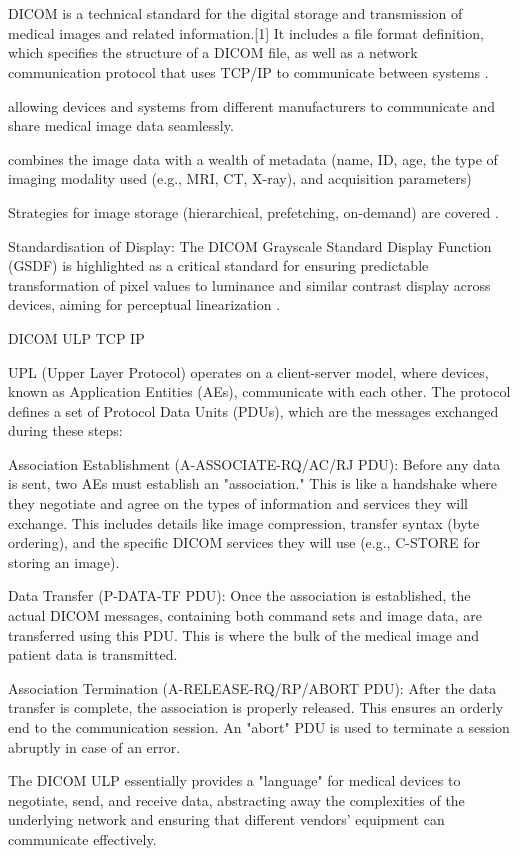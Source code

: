 \chapter{}

DICOM is a technical standard for the digital storage and transmission
of medical images and related information.[1] It includes a file
format definition, which specifies the structure of a DICOM file, as
well as a network communication protocol that uses TCP/IP to
communicate between systems \cite{wikipedia2025DICOM}.

allowing devices and systems from different manufacturers to communicate and share medical image data seamlessly.

combines the image data with a wealth of metadata (name, ID, age, the type of imaging modality used (e.g., MRI, CT, X-ray), and acquisition parameters)

Strategies for image storage (hierarchical, prefetching, on-demand)
are covered \cite{bushberg2011essential}.

Standardisation of Display: The DICOM Grayscale Standard Display Function (GSDF) is highlighted as a critical standard for ensuring predictable transformation of pixel values to luminance and similar contrast display across devices, aiming for perceptual linearization \cite{bushberg2011essential}.

DICOM ULP
TCP
IP


UPL (Upper Layer Protocol) operates on a client-server model, where devices, known as Application Entities (AEs), communicate with each other. The protocol defines a set of Protocol Data Units (PDUs), which are the messages exchanged during these steps:

    Association Establishment (A-ASSOCIATE-RQ/AC/RJ PDU): Before any data is sent, two AEs must establish an "association." This is like a handshake where they negotiate and agree on the types of information and services they will exchange. This includes details like image compression, transfer syntax (byte ordering), and the specific DICOM services they will use (e.g., C-STORE for storing an image).

Data Transfer (P-DATA-TF PDU): Once the association is established, the actual DICOM messages, containing both command sets and image data, are transferred using this PDU. This is where the bulk of the medical image and patient data is transmitted.

Association Termination (A-RELEASE-RQ/RP/ABORT PDU): After the data transfer is complete, the association is properly released. This ensures an orderly end to the communication session. An "abort" PDU is used to terminate a session abruptly in case of an error.

The DICOM ULP essentially provides a "language" for medical devices to negotiate, send, and receive data, abstracting away the complexities of the underlying network and ensuring that different vendors' equipment can communicate effectively.
